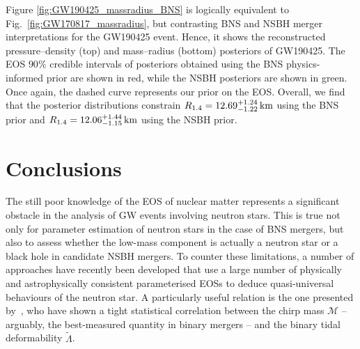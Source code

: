 \documentclass[twocolumn,linenumbers]{aastex631}
\begin{document}
Figure \ref{fig:GW190425_massradius_BNS} is logically equivalent to
Fig.~\ref{fig:GW170817_massradius}, but contrasting BNS and NSBH merger
interpretations for the GW190425 event. Hence, it shows the reconstructed
pressure--density (top) and mass--radius (bottom) posteriors of
GW190425. The EOS $90\%$ credible intervals of posteriors obtained using
the BNS physics-informed prior are shown in red, while the NSBH
posteriors are shown in green. Once again, the dashed curve represents
our prior on the EOS. Overall, we find that the posterior distributions
constrain $R_{1.4} = 12.69^{+1.24}_{-1.22} \, {\rm km}$ using the BNS
prior and $R_{1.4} = 12.06^{+1.44}_{-1.15} \, {\rm km}$ using the NSBH
prior.
	



\section{Conclusions}


The still poor knowledge of the EOS of nuclear matter represents a
significant obstacle in the analysis of GW events involving neutron
stars. This is true not only for parameter estimation of neutron stars in
the case of BNS mergers, but also to assess whether the low-mass
component is actually a neutron star or a black hole in candidate NSBH
mergers. To counter these limitations, a number of approaches have
recently been developed that use a large number of physically and
astrophysically consistent parameterised EOSs to deduce quasi-universal
behaviours of the neutron star. A particularly useful relation is the one
presented by~\cite{Altiparmak:2022}, who have shown a tight statistical
correlation between the chirp mass $\mathcal{M}$ -- arguably, the
best-measured quantity in binary mergers -- and the binary tidal
deformability $\tilde{\Lambda}$.
\end{document}
